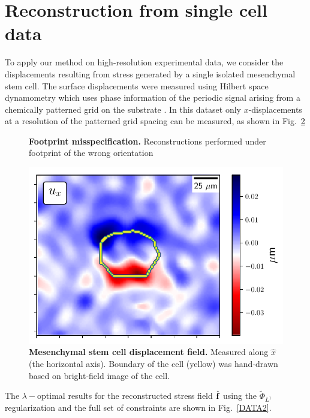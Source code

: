 \documentclass[aps,prl,reprint,twocolumn,groupedaddress,showpacs]{revtex4}
\def\f{{\bf f}}
\begin{document}
\section{Reconstruction from single cell data}

To apply our method on high-resolution experimental data, we consider
the displacements resulting from stress generated by a single isolated
mesenchymal stem cell. The surface displacements were measured using
Hilbert space dynamometry which uses phase information of the periodic
signal arising from a chemically patterned grid on the substrate
\cite{POPESCU}.  In this dataset only $x$-displacements at a
resolution of the patterned grid spacing can be measured, as shown in
Fig.~\ref{DATA}



\begin{figure}
\caption{\textbf{Footprint misspecification.} Reconstructions performed under footprint of the wrong orientation}
\label{DATA}
\end{figure}

\begin{figure}
\includegraphics[width=\linewidth]{fig8}
\caption{\textbf{Mesenchymal stem cell displacement field.} Measured
 along $\hat{x}$ (the horizontal axis). Boundary of the cell (yellow) was hand-drawn
based on bright-field image of the cell.
}
\label{DATA}
\end{figure}
%
The $\lambda-$optimal results for the reconstructed stress field
$\hat{\f}$ using the $\tilde{\Phi}_{L^{1}}$ regularization and the
full set of constraints are shown in Fig.~\ref{DATA2}.
\end{document}
